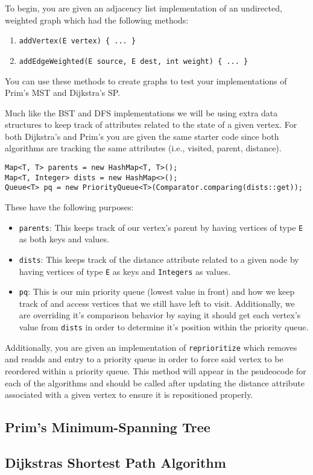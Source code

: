 \documentclass[a4paper]{article}
\begin{document}
To begin, you are given an adjacency list implementation of an undirected,
weighted graph which had the following methods:
\begin{enumerate}
    \item \lstinline|addVertex(E vertex) { ... }|
    \item \lstinline|addEdgeWeighted(E source, E dest, int weight) { ... }|
\end{enumerate}
You can use these methods to create graphs to test your implementations of
Prim's MST and Dijkstra's SP. 

Much like the BST and DFS implementations we will be using extra data 
structures to keep track of attributes related to the state of a given
vertex. For both Dijkstra's and Prim's you are given the same starter code
since both algorithms are tracking the same attributes (i.e., visited, parent,
distance).

\begin{lstlisting}
Map<T, T> parents = new HashMap<T, T>();
Map<T, Integer> dists = new HashMap<>();
Queue<T> pq = new PriorityQueue<T>(Comparator.comparing(dists::get));
\end{lstlisting}

These have the following purposes:
\begin{itemize}
    \item \lstinline|parents|: This keeps track of our vertex's parent by having vertices of type \lstinline|E| as both keys and values.
    \item \lstinline|dists|: This keeps track of the distance attribute related to a given node by having vertices of type \lstinline|E| as keys and \lstinline|Integers| as values.
    \item \lstinline|pq|: This is our min priority queue (lowest value in front) and how we keep track of and access vertices that we still have left to visit. Additionally, we are overriding it's comparison behavior by saying it should get each vertex's value from \lstinline|dists| in order to determine it's position within the priority queue. 
\end{itemize}

Additionally, you are given an implementation of \lstinline|reprioritize| which
removes and readds and entry to a priority queue in order to force said vertex
to be reordered within a priority queue.  This method will appear in the
psudeocode for each of the algorithms and should be called after updating the 
distance attribute associated with a given vertex to ensure it is repositioned 
properly.

\newpage
\subsection{Prim's Minimum-Spanning Tree}


\newpage
\subsection{Dijkstras Shortest Path Algorithm}

\end{document}
